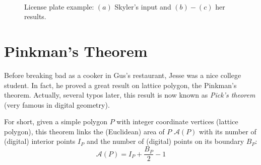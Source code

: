 \documentclass[a4paper, 11pt]{article}
\begin{document}
\begin{figure}[!htbp]
  \begin{center}
    \\
  \end{center}
  \caption{License plate example: $(a)$ Skyler's input and $(b)-(c)$ her results.}
  \label{fig:license}
\end{figure}


\section{Pinkman's Theorem}


Before breaking bad as a cooker in Gus's restaurant, Jesse was a nice
college student. In fact, he proved a great result on lattice polygon, the Pinkman's
theorem. Actually, several typos later, this result is now known as
\emph{Pick's theorem} (very  famous  in digital geometry).

For short, given a simple polygon $P$ with integer coordinate
vertices (lattice polygon), this theorem links the (Euclidean) area of $P$
$\mathcal{A}(P)$ with its number of (digital) interior points $I_P$
and the number of (digital) points on its boundary $B_P$:
\begin{equation}
\label{eq:pinkmans-theorem}
  \mathcal{A}(P) = I_P + \frac{B_P}{2} - 1 
\end{equation}
\end{document}
